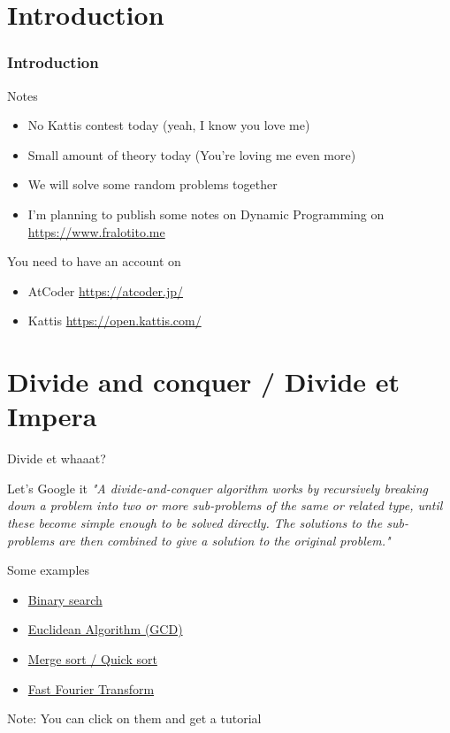 \documentclass{beamer}
\begin{document}
  
  \section{Introduction}
  \begin{frame}
  \frametitle{Introduction}
    \begin{block}{Notes}
        \begin{itemize}
            \item{No Kattis contest today} (yeah, I know you love me)
            \item{Small amount of theory today} (You're loving me even more)
            \item{We will solve some random problems together}
            \item{I'm planning to publish some notes on Dynamic Programming on \url{https://www.fralotito.me}}
        \end{itemize}
    \end{block}
    
    \pause

    \alert{You need to have an account on} 
    \begin{itemize}
      \item{AtCoder} \url{https://atcoder.jp/}
      \item{Kattis} \url{https://open.kattis.com/}
    \end{itemize}
  \end{frame}
  
  \section{Divide and conquer / Divide et Impera}

  \begin{frame}{Divide et whaaat?}
    \begin{block}{Let's Google it}
      \textit{"A divide-and-conquer algorithm works by recursively breaking down a problem into two or more sub-problems of the same or related type, until these become simple enough to be solved directly. The solutions to the sub-problems are then combined to give a solution to the original problem."}
    \end{block}
  \end{frame}

  \begin{frame}{Some examples}
    \begin{itemize}
      \item \href{https://www.geeksforgeeks.org/python-program-for-binary-search/}{Binary search}
      \item \href{https://www.geeksforgeeks.org/euclidean-algorithms-basic-and-extended/}{Euclidean Algorithm (GCD)}
      \item \href{https://www.geeksforgeeks.org/merge-sort/}{Merge sort / Quick sort}
      \item \href{https://www.geeksforgeeks.org/fast-fourier-transformation-poynomial-multiplication/}{Fast Fourier Transform}
    \end{itemize}
    
    \pause
    \alert{Note:} You can click on them and get a tutorial
  \end{frame}
  
\end{document}
